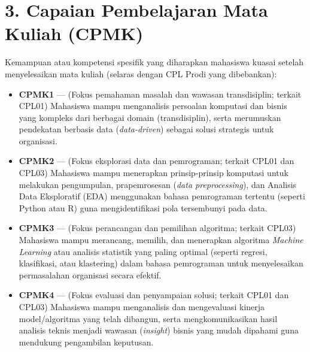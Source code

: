 \documentclass[12pt,a4paper]{article}
\begin{document}
\vspace{0.5cm}

\section*{3. Capaian Pembelajaran Mata Kuliah (CPMK)}

Kemampuan atau kompetensi spesifik yang diharapkan mahasiswa kuasai setelah menyelesaikan mata kuliah (selaras dengan CPL Prodi yang dibebankan):

\begin{itemize}[leftmargin=*]
  \item \textbf{CPMK1} --- (Fokus pemahaman masalah dan wawasan transdisiplin; terkait CPL01) Mahasiswa mampu menganalisis persoalan komputasi dan bisnis yang kompleks dari berbagai domain (transdisiplin), serta merumuskan pendekatan berbasis data (\textit{data-driven}) sebagai solusi strategis untuk organisasi.

  \item \textbf{CPMK2} --- (Fokus eksplorasi data dan pemrograman; terkait CPL01 dan CPL03) Mahasiswa mampu menerapkan prinsip-prinsip komputasi untuk melakukan pengumpulan, prapemrosesan (\textit{data preprocessing}), dan Analisis Data Eksploratif (EDA) menggunakan bahasa pemrograman tertentu (seperti Python atau R) guna mengidentifikasi pola tersembunyi pada data.

  \item \textbf{CPMK3} --- (Fokus perancangan dan pemilihan algoritma; terkait CPL03) Mahasiswa mampu merancang, memilih, dan menerapkan algoritma \textit{Machine Learning} atau analisis statistik yang paling optimal (seperti regresi, klasifikasi, atau klastering) dalam bahasa pemrograman untuk menyelesaikan permasalahan organisasi secara efektif.

  \item \textbf{CPMK4} --- (Fokus evaluasi dan penyampaian solusi; terkait CPL01 dan CPL03) Mahasiswa mampu menganalisis dan mengevaluasi kinerja model/algoritma yang telah dibangun, serta mengkomunikasikan hasil analisis teknis menjadi wawasan (\textit{insight}) bisnis yang mudah dipahami guna mendukung pengambilan keputusan.
\end{itemize}

\vspace{0.5cm}
\end{document}
